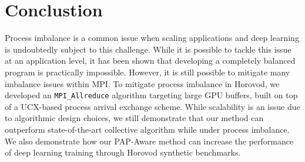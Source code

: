 \section{Conclustion}
Process imbalance is a common issue when scaling applications and deep learning is undoubtedly subject to this challenge.
While it is possible to tackle this issue at an application level, it has been shown that developing a completely balanced program is practically impossible.
However, it is still possible to mitigate many imbalance issues within MPI.
To mitigate process imbalance in Horovod, we developed an \texttt{MPI\_Allreduce} algorithm targeting large GPU buffers, built on top of a UCX-based process arrival exchange scheme.  
While scalability is an issue due to algorithmic design choices, we still demonstrate that our method can outperform state-of-the-art collective algorithm while under process imbalance.
We also demonstrate how our PAP-Aware method can increase the performance of deep learning training through Horovod synthetic benchmarks.
